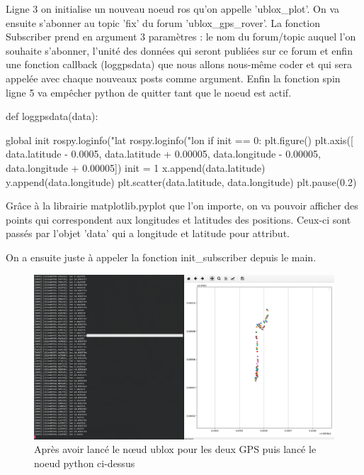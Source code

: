 \vspace{0.5cm}
Ligne 3 on initialise un nouveau noeud ros qu'on appelle 'ublox\_plot'.
On va ensuite s'abonner au topic 'fix' du forum 'ublox\_gps\_rover'. La fonction Subscriber prend en argument 3 paramètres : le nom du forum/topic auquel l'on souhaite s'abonner, l'unité des données qui seront publiées sur ce forum et enfin une fonction callback (loggpsdata) que nous allons nous-même coder et qui sera appelée avec chaque nouveaux posts comme argument.
Enfin la fonction spin ligne 5 va empêcher python de quitter tant que le noeud est actif.
\vspace{0.5cm}
\begin{python}
def loggpsdata(data):

    global init
    rospy.loginfo("lat %
    rospy.loginfo("lon %
    if init == 0:
        plt.figure()
        plt.axis([ data.latitude - 0.0005, data.latitude + 0.00005,
            data.longitude - 0.00005, data.longitude + 0.00005])
        init = 1
    x.append(data.latitude)
    y.append(data.longitude)
    plt.scatter(data.latitude, data.longitude)
    plt.pause(0.2)
\end{python}

Grâce à la librairie matplotlib.pyplot que l'on importe, on va pouvoir afficher des points qui correspondent aux longitudes et latitudes des positions. Ceux-ci sont passés par l'objet 'data' qui a longitude et latitude pour attribut.

On a ensuite juste à appeler la fonction init\_subscriber depuis le main.

\begin{figure}[!htbp]
    \centering
	\includegraphics[width=\textwidth]{img/pyplot.png}
    \caption{Après avoir lancé le n\oe{}ud ublox pour les deux GPS puis lancé le noeud python ci-dessus}
\end{figure}
